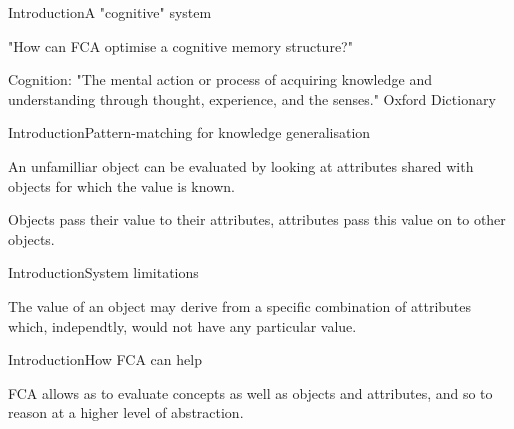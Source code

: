 \begin{frame}{Introduction}{A "cognitive" system}

"How can FCA  optimise a cognitive memory  structure?"

Cognition:
"The mental action or process of acquiring knowledge and understanding through thought, experience, and the senses."
Oxford Dictionary

\end{frame}

\begin{frame}{Introduction}{Pattern-matching for knowledge generalisation}

An unfamilliar object can be evaluated by looking at attributes shared with objects for which the value is known.

Objects pass their value to their attributes, attributes pass this value on to other objects.

\end{frame}

\begin{frame}{Introduction}{System limitations}

The value of an object may derive from a specific combination of attributes which, independtly, would not have 
any particular value.

\end{frame}

\begin{frame}{Introduction}{How FCA can help}

FCA allows as to evaluate concepts as well as objects and attributes, and so to reason at a higher level of
abstraction.

\end{frame}